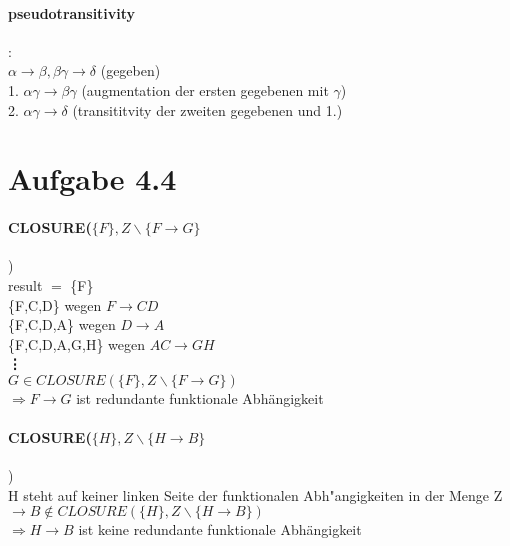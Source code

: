 \documentclass{article}
\begin{document}
		\paragraph*{pseudotransitivity}:\\
			$\alpha \rightarrow \beta, \beta\gamma \rightarrow \delta$ \hspace*{25mm} (gegeben)\\
			1. $ \alpha\gamma \rightarrow \beta\gamma $ \hspace*{30mm} (augmentation der ersten gegebenen mit $\gamma$)\\
			2. $\alpha \gamma \rightarrow \delta$ \hspace*{32mm} (transititvity der zweiten gegebenen und 1.)\\
			
			
		
		
	\section*{Aufgabe 4.4}
		\paragraph*{CLOSURE($\{ F \}, Z\backslash\{F \longrightarrow G\}$})\\
		result $=$ \{F\}\\
		
			\{F,C,D\} \hspace*{42mm} wegen $F \rightarrow CD$\\
			
			\{F,C,D,A\} \hspace*{39mm} wegen $D \rightarrow A$\\
			
			\{F,C,D,A,G,H\} \hspace*{32mm} wegen $AC \rightarrow GH$\\
			
			\hspace*{11mm}\textbf{\vdots}\\[1.2em]
			$G \in CLOSURE(\{F\}, Z \backslash \{F \longrightarrow G\})$\\
			$\Rightarrow F \rightarrow G$ ist redundante funktionale Abhängigkeit
	
		\paragraph*{CLOSURE($\{H\}, Z \backslash \{H \rightarrow B\}$})\\
		H steht auf keiner linken Seite der funktionalen Abh"angigkeiten in der Menge Z\\
		$\rightarrow B \notin CLOSURE(\{H\}, Z \backslash \{H \rightarrow B\})$\\ $\Rightarrow H \rightarrow B$ ist keine redundante funktionale Abhängigkeit
		
	
	
\end{document}
